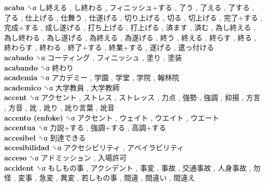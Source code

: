 \textbf{acaba} ␝α   し終える ,  し終わる ,  フィニッシュ+する ,  了う ,  了える ,  了する ,  了る ,  仕上げる ,  仕舞う ,  仕遂げる ,  切り上げる ,  切る ,  切上げる ,  完了+する ,  完成+する ,  成し遂げる ,  打ち上げる ,  打上げる ,  済ます ,  済む ,  為し終える ,  為し終わる ,  為し遂げる ,  為終える ,  為遂げる ,  終う ,  終える ,  終らす ,  終る ,  終わらす ,  終わる ,  終了+する ,  終業+する ,  遂げる ,  遣っ付ける   \\
\textbf{acabado} ␝α   コーティング ,  フィニッシュ ,  塗り ,  塗装   \\
\textbf{acabando} ␝α   終わり   \\
\textbf{academia} ␝α   アカデミー ,  学園 ,  学堂 ,  学院 ,  翰林院   \\
\textbf{academico} ␝α   大学教員 ,  大学教師   \\
\textbf{accent} ␝α   アクセント ,  ストレス ,  ストレッス ,  力点 ,  強勢 ,  強調 ,  抑揚 ,  方言 ,  方音 ,  訛 ,  訛り ,  訛り言葉 ,  訛音   \\
\textbf{accento (enfoke)} ␝α   アクセント ,  ウェイト ,  ウエイト ,  ウエート   \\
\textbf{accentua} ␝α   力説+する ,  強調+する ,  高調+する   \\
\textbf{accesibel} ␝α   到達できる   \\
\textbf{accesibilidad} ␝α   アクセシビリティ ,  アベイラビリティ   \\
\textbf{acceso} ␝α   アドミッション ,  入場許可   \\
\textbf{accident} ␝α   もしもの事 ,  アクシデント ,  事変 ,  事故 ,  交通事故 ,  人身事故 ,  勿怪 ,  変事 ,  急変 ,  異変 ,  若しもの事 ,  間違 ,  間違い ,  間違え   \\
